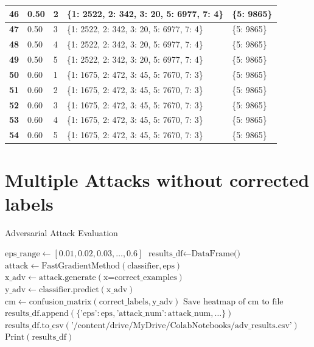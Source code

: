 \documentclass[11pt,onside]{article}
\begin{document}
\begin{table}[]
\begin{tabular}{|l|l|l|l|l|}
\textbf{46} & 0.50         & 2            & \{1: 2522, 2: 342, 3: 20, 5: 6977, 7: 4\} & \{5: 9865\}              \\ \hline
\textbf{47} & 0.50         & 3            & \{1: 2522, 2: 342, 3: 20, 5: 6977, 7: 4\} & \{5: 9865\}              \\ \hline
\textbf{48} & 0.50         & 4            & \{1: 2522, 2: 342, 3: 20, 5: 6977, 7: 4\} & \{5: 9865\}              \\ \hline
\textbf{49} & 0.50         & 5            & \{1: 2522, 2: 342, 3: 20, 5: 6977, 7: 4\} & \{5: 9865\}              \\ \hline
\textbf{50} & 0.60         & 1            & \{1: 1675, 2: 472, 3: 45, 5: 7670, 7: 3\} & \{5: 9865\}              \\ \hline
\textbf{51} & 0.60         & 2            & \{1: 1675, 2: 472, 3: 45, 5: 7670, 7: 3\} & \{5: 9865\}              \\ \hline
\textbf{52} & 0.60         & 3            & \{1: 1675, 2: 472, 3: 45, 5: 7670, 7: 3\} & \{5: 9865\}              \\ \hline
\textbf{53} & 0.60         & 4            & \{1: 1675, 2: 472, 3: 45, 5: 7670, 7: 3\} & \{5: 9865\}              \\ \hline
\textbf{54} & 0.60         & 5            & \{1: 1675, 2: 472, 3: 45, 5: 7670, 7: 3\} & \{5: 9865\}              \\ \hline
\end{tabular}
\end{table}
\clearpage %

\section{Multiple Attacks without corrected labels}

\begin{algorithm}[H]
\caption{Adversarial Attack Evaluation}
\begin{algorithmic}[1]
\State $\text{eps\_range} \gets [0.01, 0.02, 0.03, \ldots, 0.6]$
\State $\text{results\_df} \gets \text{DataFrame()}$
        \State $\text{attack} \gets \text{FastGradientMethod}(\text{classifier}, \text{eps})$
        \State $\text{x\_adv} \gets \text{attack.generate}(\text{x=correct\_examples})$
        \State $\text{y\_adv} \gets \text{classifier.predict}(\text{x\_adv})$
        \State $\text{cm} \gets \text{confusion\_matrix}(\text{correct\_labels}, \text{y\_adv})$
        \State $\text{Save heatmap of cm to file}$
        \State $\text{results\_df.append}(\{\text{'eps'}: \text{eps}, \text{'attack\_num'}: \text{attack\_num}, \ldots\})$
    \EndFor
\EndFor
\State $\text{results\_df.to\_csv}(\text{'/content/drive/MyDrive/ColabNotebooks/adv\_results.csv'})$
\State $\text{Print}(\text{results\_df})$
\end{algorithmic}
\end{algorithm}
\end{document}
